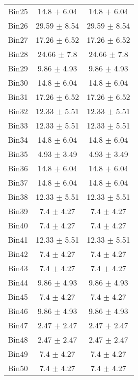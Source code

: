 \begin{tabular}{|c|c|c|}
     Bin25 & 14.8 $\pm$ 6.04 & 14.8 $\pm$ 6.04 \\ \cline{1-3} 
     Bin26 & 29.59 $\pm$ 8.54 & 29.59 $\pm$ 8.54 \\ \cline{1-3} 
     Bin27 & 17.26 $\pm$ 6.52 & 17.26 $\pm$ 6.52 \\ \cline{1-3} 
     Bin28 & 24.66 $\pm$ 7.8 & 24.66 $\pm$ 7.8 \\ \cline{1-3} 
     Bin29 & 9.86 $\pm$ 4.93 & 9.86 $\pm$ 4.93 \\ \cline{1-3} 
     Bin30 & 14.8 $\pm$ 6.04 & 14.8 $\pm$ 6.04 \\ \cline{1-3} 
     Bin31 & 17.26 $\pm$ 6.52 & 17.26 $\pm$ 6.52 \\ \cline{1-3} 
     Bin32 & 12.33 $\pm$ 5.51 & 12.33 $\pm$ 5.51 \\ \cline{1-3} 
     Bin33 & 12.33 $\pm$ 5.51 & 12.33 $\pm$ 5.51 \\ \cline{1-3} 
     Bin34 & 14.8 $\pm$ 6.04 & 14.8 $\pm$ 6.04 \\ \cline{1-3} 
     Bin35 & 4.93 $\pm$ 3.49 & 4.93 $\pm$ 3.49 \\ \cline{1-3} 
     Bin36 & 14.8 $\pm$ 6.04 & 14.8 $\pm$ 6.04 \\ \cline{1-3} 
     Bin37 & 14.8 $\pm$ 6.04 & 14.8 $\pm$ 6.04 \\ \cline{1-3} 
     Bin38 & 12.33 $\pm$ 5.51 & 12.33 $\pm$ 5.51 \\ \cline{1-3} 
     Bin39 & 7.4 $\pm$ 4.27 & 7.4 $\pm$ 4.27 \\ \cline{1-3} 
     Bin40 & 7.4 $\pm$ 4.27 & 7.4 $\pm$ 4.27 \\ \cline{1-3} 
     Bin41 & 12.33 $\pm$ 5.51 & 12.33 $\pm$ 5.51 \\ \cline{1-3} 
     Bin42 & 7.4 $\pm$ 4.27 & 7.4 $\pm$ 4.27 \\ \cline{1-3} 
     Bin43 & 7.4 $\pm$ 4.27 & 7.4 $\pm$ 4.27 \\ \cline{1-3} 
     Bin44 & 9.86 $\pm$ 4.93 & 9.86 $\pm$ 4.93 \\ \cline{1-3} 
     Bin45 & 7.4 $\pm$ 4.27 & 7.4 $\pm$ 4.27 \\ \cline{1-3} 
     Bin46 & 9.86 $\pm$ 4.93 & 9.86 $\pm$ 4.93 \\ \cline{1-3} 
     Bin47 & 2.47 $\pm$ 2.47 & 2.47 $\pm$ 2.47 \\ \cline{1-3} 
     Bin48 & 2.47 $\pm$ 2.47 & 2.47 $\pm$ 2.47 \\ \cline{1-3} 
     Bin49 & 7.4 $\pm$ 4.27 & 7.4 $\pm$ 4.27 \\ \cline{1-3} 
     Bin50 & 7.4 $\pm$ 4.27 & 7.4 $\pm$ 4.27 \\ \cline{1-3} 

\end{tabular}
